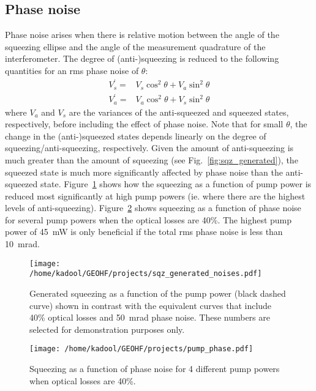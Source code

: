 \documentclass{ligodoc}
\begin{document}
\subsection{Phase noise}
Phase noise arises when there is relative motion between the angle of
the squeezing ellipse and the angle of the measurement quadrature of
the interferometer. The degree of (anti-)squeezing is reduced to the
following quantities for an rms phase noise of $\theta$:
\begin{eqnarray}
V_s^{\prime} =& V_s \cos^2{\theta} + V_a \sin^2{\theta} \\
V_a^{\prime} =& V_a \cos^2{\theta} + V_s \sin^2{\theta} 
\end{eqnarray}
where $V_a$ and $V_s$ are the variances of the anti-squeezed and
squeezed states, respectively, before including the effect of phase
noise. Note that for small $\theta$, the change in the (anti-)squeezed
states depends linearly on the degree of squeezing/anti-squeezing,
respectively. Given the amount of anti-squeezing is much greater than
the amount of squeezing (see Fig.~\ref{fig:sqz_generated}), the
squeezed state is much more significantly affected by phase noise than
the anti-squeezed state. Figure~\ref{fig:sqz_generated_noises} shows
how the squeezing as a function of pump power is reduced most
significantly at high pump powers (ie. where there are the highest
levels of anti-squeezing). Figure~\ref{fig:pump_phase} shows squeezing
as a function of phase noise for several pump powers when the optical
losses are 40\%. The highest pump power of 45~mW is only beneficial if
the total rms phase noise is less than 10~mrad.

\begin{figure}
\begin{centering}
\texttt{[image: /home/kadool/GEOHF/projects/sqz\_generated\_noises.pdf]}
\caption{Generated squeezing as a function of the pump power (black
  dashed curve) shown in contrast with the equivalent curves that
  include 40\% optical losses and 50~mrad phase noise. These numbers
  are selected for demonstration purposes only.}
\label{fig:sqz_generated_noises}
\end{centering}
\end{figure}

\begin{figure}
\begin{centering}
\texttt{[image: /home/kadool/GEOHF/projects/pump\_phase.pdf]}
\caption{Squeezing as a function of phase noise for 4 different pump
  powers when optical losses are 40\%.}
\label{fig:pump_phase}
\end{centering}
\end{figure}
\end{document}
